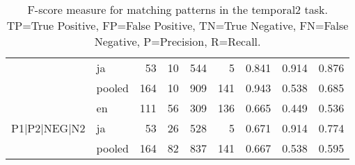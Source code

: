 \begin{table}[h!]
\begin{tabular}{llrrrrrrr}
 & ja & 53 & 10 & 544 & 5 & 0.841 & 0.914 & 0.876 \\
 & pooled & 164 & 10 & 909 & 141 & 0.943 & 0.538 & 0.685 \\
\cline{1-9}
\multirow[t]{3}{*}{P1|P2|NEG|N2} & en & 111 & 56 & 309 & 136 & 0.665 & 0.449 & 0.536 \\
 & ja & 53 & 26 & 528 & 5 & 0.671 & 0.914 & 0.774 \\
 & pooled & 164 & 82 & 837 & 141 & 0.667 & 0.538 & 0.595 \\
\cline{1-9}
\bottomrule
\end{tabular}
\caption{F-score measure for matching patterns in the temporal2 task. TP=True Positive, FP=False Positive, TN=True Negative, FN=False Negative, P=Precision, R=Recall.}
\label{tab:temporal2_f1}
\end{table}
